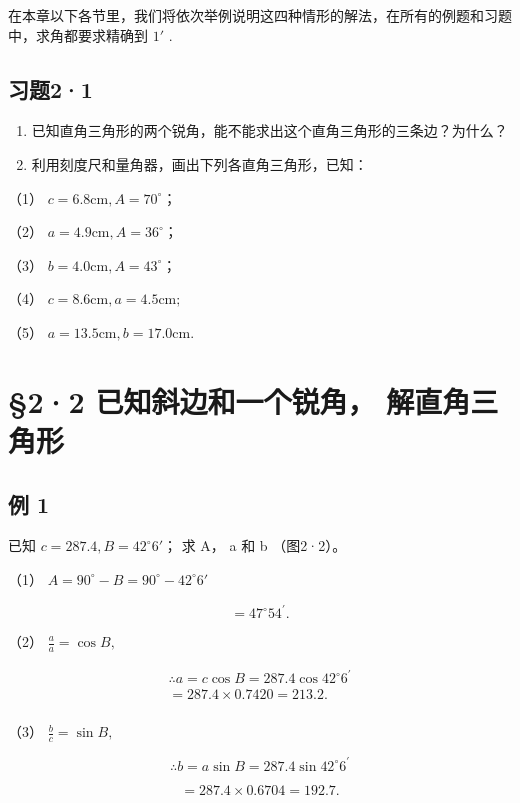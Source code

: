 在本章以下各节里，我们将依次举例说明这四种情形的解法，在所有的例题和习题中，求角都要求精确到
\(1'\) .

\subsection{习题2·1}

\begin{enumerate}
\item
  已知直角三角形的两个锐角，能不能求出这个直角三角形的三条边？为什么？
\item
  利用刻度尺和量角器，画出下列各直角三角形，已知：
\end{enumerate}

（1） \(c = 6.8\mathrm{cm}, A = 70^{\circ}\)；

（2） \(a = 4.9\mathrm{cm}, A = 36^{\circ}\)；

（3） \(b = 4.0\mathrm{cm}, A = 43^{\circ}\)；

（4） \(c = 8.6\mathrm{cm}, a = 4.5\mathrm{cm};\)

（5） \(a = 13.5\mathrm{cm}, b = 17.0\mathrm{cm}\).

\section{§2·2 已知斜边和一个锐角， 解直角三角形}

\subsection{例 1}

已知 \(c=287.4, B=42^{\circ}6'\)； 求 A， a 和 b （图2·2）。

 （1） \(A = 90^{\circ} - B = 90^{\circ} - 42^{\circ}6'\)

\[
= 47 ^{\circ} 54 ^{\prime}.
\]

（2） \(\frac{a}{a} = \cos B,\)

\[
\begin{array}{l} \therefore a = c \cos B = 287.4 \cos 42 ^{\circ} 6 ^{\prime} \\ = 287.4 \times 0.7420 = 213.2. \\ \end{array}
\]

（3） \(\frac{b}{c} = \sin B,\)

\[
\therefore b = a \sin B = 287.4 \sin 42 ^{\circ} 6 ^{\prime}
\]

\[
= 287.4 \times 0.6704 = 192.7.
\]

